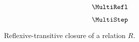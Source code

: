 
\begin{figure}
    \centering
    \begin{minipage}{0.5\textwidth}
        $$\MultiRefl$$
    \end{minipage}%
    \begin{minipage}{0.5\textwidth}
        $$\MultiStep$$
    \end{minipage}%
    \caption{Reflexive-transitive closure of a relation $R$.}
    \label{fig:multi}
\end{figure}


